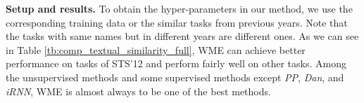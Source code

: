\documentclass[11pt,a4paper]{article}
\newcommand{\1}{\boldsymbol{1}}
\begin{document}

\textbf{Setup and results.} To obtain the hyper-parameters in our method, we use the corresponding training data or the similar tasks from previous years. Note that the tasks with same names but in different years are different ones. As we can see in Table \ref{tb:comp_textual_similarity_full}, WME can achieve better performance on tasks of STS'12 and perform fairly well on other tasks. Among the unsupervised methods and some supervised methods except \emph{PP}, \emph{Dan}, and \emph{iRNN}, WME is almost always to be one of the best methods. 
\end{document}
